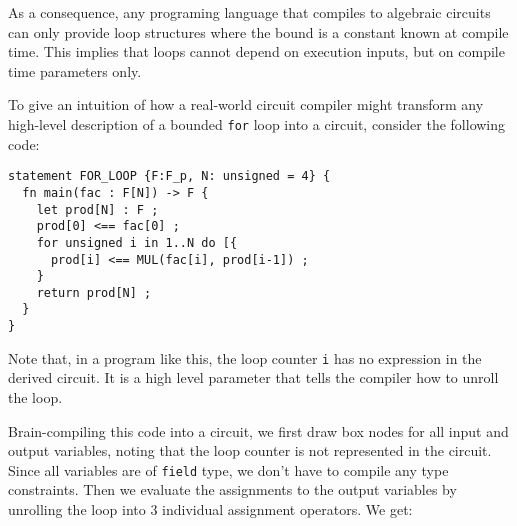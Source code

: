 As a consequence, any programing language that compiles to algebraic circuits can only provide loop structures where the bound is a constant known at compile time. This implies that loops cannot depend on execution inputs, but on compile time parameters only.  
\begin{example} To give an intuition of how a real-world circuit compiler might transform any high-level description of a bounded \texttt{for} loop into a circuit, consider the following  code:
\begin{lstlisting}
statement FOR_LOOP {F:F_p, N: unsigned = 4} {
  fn main(fac : F[N]) -> F {
  	let prod[N] : F ;
  	prod[0] <== fac[0] ;
    for unsigned i in 1..N do [{
      prod[i] <== MUL(fac[i], prod[i-1]) ; 
    }
    return prod[N] ;
  }
}
\end{lstlisting}
Note that, in a program like this, the loop counter \texttt{i} has no expression in the derived circuit. It is a high level parameter that tells the compiler how to unroll the loop.

Brain-compiling this code into a circuit, we first draw box nodes for all input and output variables, noting that the loop counter is not represented in the circuit. Since all variables are of \texttt{field} type, we don't have to compile any type constraints. Then we evaluate the assignments to the output variables by unrolling the loop into $3$ individual assignment operators. We get:
\begin{center}
\end{center}
\end{example}
